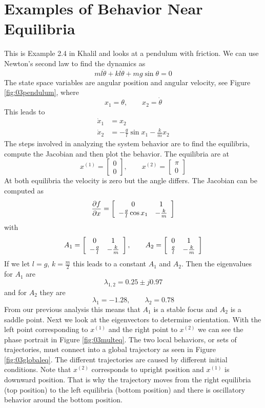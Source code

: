 \section{Examples of Behavior Near Equilibria}
\begin{example}
This is Example 2.4 in Khalil and looks at a pendulum with friction. We can use Newton's second law to find the dynamics as
$$ml\ddot{\theta} + kl\dot{\theta} + mg\sin\theta = 0$$
The state space variables are angular position and angular velocity, see Figure \ref{fig:03pendulum}, where
$$ x_1 = \theta, \qquad x_2 = \dot{\theta}$$
This leads to
\begin{align*}
\dot{x}_1 &= x_2 \\
\dot{x}_2 &= -\tfrac{g}{l}\sin x_1 - \tfrac{k}{m}x_2
\end{align*}
The steps involved in analyzing the system behavior are to find the equilibria, compute the Jacobian and then plot the behavior. The equilibria are at
$$x^{(1)} = \left[\begin{array}{c} 0 \\ 0 \end{array}\right], \qquad x^{(2)} = \left[\begin{array}{c} \pi \\ 0 \end{array}\right]$$
At both equilibria the velocity is zero but the angle differs. The Jacobian can be computed as
$$\frac{\partial f}{\partial x} = \left[\begin{array}{c c} 0 & 1 \\ -\tfrac{g}{l}\cos x_1 & -\tfrac{k}{m} \end{array}\right]$$
with
$$A_1 = \left[\begin{array}{c c} 0 & 1 \\ -\tfrac{g}{l} & -\tfrac{k}{m} \end{array}\right], \qquad A_2 = \left[\begin{array}{c c} 0 & 1 \\ \tfrac{g}{l} & -\tfrac{k}{m} \end{array}\right]$$
If we let $l=g$, $k=\tfrac{m}{2}$ this leads to a constant $A_1$ and $A_2$. Then the eigenvalues for $A_1$ are
$$\lambda_{1,2} = 0.25\pm j0.97$$
and for $A_2$ they are
$$\lambda_1 = -1.28, \qquad \lambda_2 = 0.78$$
From our previous analysis this means that $A_1$ is a stable focus and $A_2$ is a saddle point. Next we look at the eigenvectors to determine orientation. With the left point corresponding to $x^{(1)}$ and the right point to $x^{(2)}$ we can see the phase portrait in Figure \ref{fig:03multeq}. The two local behaviors, or sets of trajectories, must connect into a global trajectory as seen in Figure \ref{fig:03globaleq}. The different trajectories are caused by different initial conditions. Note that $x^{(2)}$ corresponds to upright position and $x^{(1)}$ is downward position. That is why the trajectory moves from the right equilibria (top position) to the left equilibria (bottom position) and there is oscillatory behavior around the bottom position.


\end{example}
